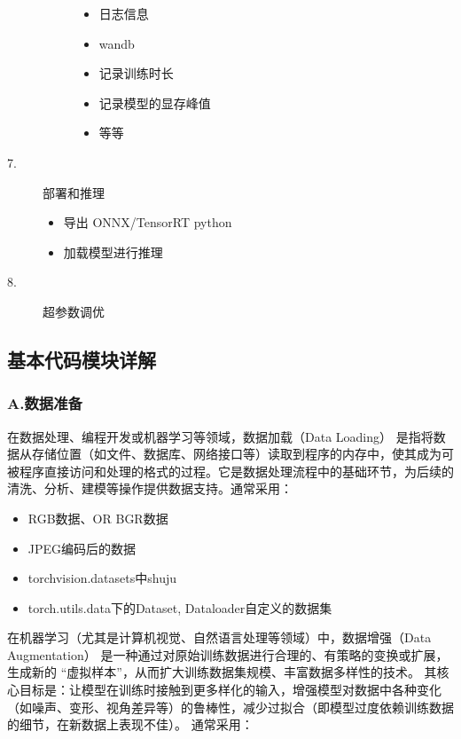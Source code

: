 \begin{description}
\begin{description}
\begin{itemize}
			\item 日志信息
			\item wandb
			\item 记录训练时长
			\item 记录模型的显存峰值
			\item 等等
		\end{itemize}
	\end{description}
	\item[7.] 部署和推理
	\begin{itemize}
		\item 导出 ONNX/TensorRT python
		\item 加载模型进行推理
	\end{itemize}
	\item[8.] 超参数调优
\end{description}

\subsection{基本代码模块详解}

\subsubsection{A.数据准备}
在数据处理、编程开发或机器学习等领域，数据加载（Data Loading） 是指将数据从存储位置（如文件、数据库、网络接口等）读取到程序的内存中，使其成为可被程序直接访问和处理的格式的过程。它是数据处理流程中的基础环节，为后续的清洗、分析、建模等操作提供数据支持。通常采用：
\begin{itemize}
	\item RGB数据、OR BGR数据
	\item JPEG编码后的数据
	\item torchvision.datasets中shuju 
	\item torch.utils.data下的Dataset, Dataloader自定义的数据集
\end{itemize}

在机器学习（尤其是计算机视觉、自然语言处理等领域）中，数据增强（Data Augmentation） 是一种通过对原始训练数据进行合理的、有策略的变换或扩展，生成新的 “虚拟样本”，从而扩大训练数据集规模、丰富数据多样性的技术。
其核心目标是：让模型在训练时接触到更多样化的输入，增强模型对数据中各种变化（如噪声、变形、视角差异等）的鲁棒性，减少过拟合（即模型过度依赖训练数据的细节，在新数据上表现不佳）。
通常采用：

